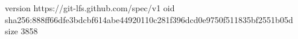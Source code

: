 version https://git-lfs.github.com/spec/v1
oid sha256:888ff66dfe3bdcbf614abe44920110c281f396dcd0e9750f511835bf2551b05d
size 3858
